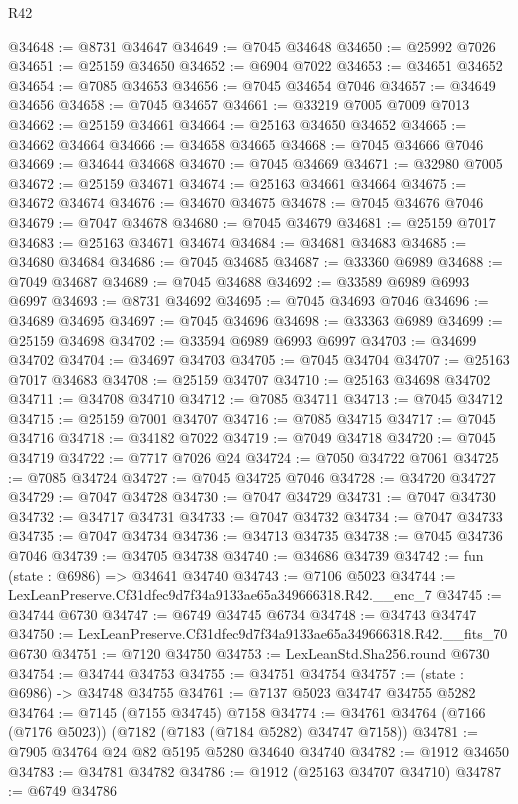 \begin{lexlean}{R42}
\begin{coremodule}
{@34648 := @8731 @34647
@34649 := @7045 @34648
@34650 := @25992 @7026
@34651 := @25159 @34650
@34652 := @6904 @7022
@34653 := @34651 @34652
@34654 := @7085 @34653
@34656 := @7045 @34654 @7046
@34657 := @34649 @34656
@34658 := @7045 @34657
@34661 := @33219 @7005 @7009 @7013
@34662 := @25159 @34661
@34664 := @25163 @34650 @34652
@34665 := @34662 @34664
@34666 := @34658 @34665
@34668 := @7045 @34666 @7046
@34669 := @34644 @34668
@34670 := @7045 @34669
@34671 := @32980 @7005
@34672 := @25159 @34671
@34674 := @25163 @34661 @34664
@34675 := @34672 @34674
@34676 := @34670 @34675
@34678 := @7045 @34676 @7046
@34679 := @7047 @34678
@34680 := @7045 @34679
@34681 := @25159 @7017
@34683 := @25163 @34671 @34674
@34684 := @34681 @34683
@34685 := @34680 @34684
@34686 := @7045 @34685
@34687 := @33360 @6989
@34688 := @7049 @34687
@34689 := @7045 @34688
@34692 := @33589 @6989 @6993 @6997
@34693 := @8731 @34692
@34695 := @7045 @34693 @7046
@34696 := @34689 @34695
@34697 := @7045 @34696
@34698 := @33363 @6989
@34699 := @25159 @34698
@34702 := @33594 @6989 @6993 @6997
@34703 := @34699 @34702
@34704 := @34697 @34703
@34705 := @7045 @34704
@34707 := @25163 @7017 @34683
@34708 := @25159 @34707
@34710 := @25163 @34698 @34702
@34711 := @34708 @34710
@34712 := @7085 @34711
@34713 := @7045 @34712
@34715 := @25159 @7001 @34707
@34716 := @7085 @34715
@34717 := @7045 @34716
@34718 := @34182 @7022
@34719 := @7049 @34718
@34720 := @7045 @34719
@34722 := @7717 @7026 @24
@34724 := @7050 @34722 @7061
@34725 := @7085 @34724
@34727 := @7045 @34725 @7046
@34728 := @34720 @34727
@34729 := @7047 @34728
@34730 := @7047 @34729
@34731 := @7047 @34730
@34732 := @34717 @34731
@34733 := @7047 @34732
@34734 := @7047 @34733
@34735 := @7047 @34734
@34736 := @34713 @34735
@34738 := @7045 @34736 @7046
@34739 := @34705 @34738
@34740 := @34686 @34739
@34742 := fun (state : @6986) => @34641 @34740
@34743 := @7106 @5023
@34744 := LexLeanPreserve.Cf31dfec9d7f34a9133ae65a349666318.R42.__enc_7
@34745 := @34744 @6730
@34747 := @6749 @34745 @6734
@34748 := @34743 @34747
@34750 := LexLeanPreserve.Cf31dfec9d7f34a9133ae65a349666318.R42.__fits_70 @6730
@34751 := @7120 @34750
@34753 := LexLeanStd.Sha256.round @6730
@34754 := @34744 @34753
@34755 := @34751 @34754
@34757 := (state : @6986) -> @34748 @34755
@34761 := @7137 @5023 @34747 @34755 @5282
@34764 := @7145 (@7155 @34745) @7158
@34774 := @34761 @34764 (@7166 (@7176 @5023)) (@7182 (@7183 (@7184 @5282) @34747 @7158))
@34781 := @7905 @34764 @24 @82 @5195 @5280 @34640 @34740
@34782 := @1912 @34650
@34783 := @34781 @34782
@34786 := @1912 (@25163 @34707 @34710)
@34787 := @6749 @34786
}
\end{coremodule}
\end{lexlean}
